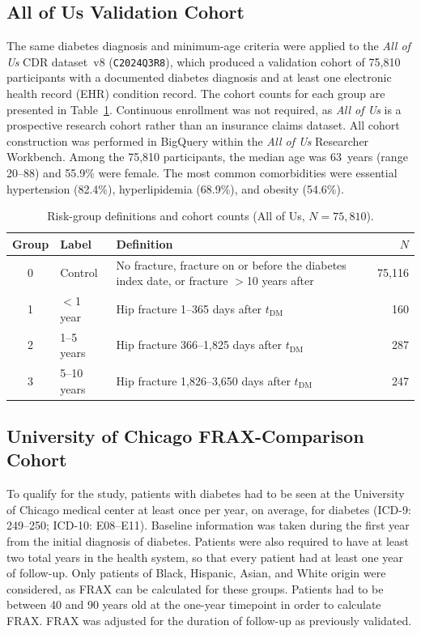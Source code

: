 \documentclass[12pt]{article}
\begin{document}
\subsection{All of Us Validation Cohort}

The same diabetes diagnosis and minimum-age criteria were applied to the \textit{All of Us} CDR dataset~v8 (\texttt{C2024Q3R8}), which produced a validation cohort of 75{,}810 participants with a documented diabetes diagnosis and at least one electronic health record (EHR) condition record. The cohort counts for each group are presented in Table~\ref{tab:groups_aou}. Continuous enrollment was not required, as \textit{All of Us} is a prospective research cohort rather than an insurance claims dataset. All cohort construction was performed in BigQuery within the \textit{All of Us} Researcher Workbench. Among the 75{,}810 participants, the median age was 63~years (range 20--88) and 55.9\% were female. The most common comorbidities were essential hypertension (82.4\%), hyperlipidemia (68.9\%), and obesity (54.6\%). 

  \begin{table}[H]
  \centering
  \caption{Risk-group definitions and cohort counts (All of Us, $N = 75{,}810$).}
  \label{tab:groups_aou}
  \begin{tabular}{clp{6cm}r}
  \toprule
  Group & Label & Definition & $N$ \\
  \midrule
  0 & Control     & No fracture, fracture on or before the diabetes index date, or fracture $>$10 years after & 75{,}116 \\
  1 & $<$1 year   & Hip fracture 1--365 days after $t_{\mathrm{DM}}$ & 160 \\
  2 & 1--5 years  & Hip fracture 366--1{,}825 days after $t_{\mathrm{DM}}$ & 287 \\
  3 & 5--10 years & Hip fracture 1{,}826--3{,}650 days after $t_{\mathrm{DM}}$ & 247 \\
  \bottomrule
  \end{tabular}
  \end{table}

\subsection{University of Chicago FRAX-Comparison Cohort}

To qualify for the study, patients with diabetes had to be seen at the University of Chicago medical center at least once per year, on average, for diabetes (ICD-9: 249--250; ICD-10: E08--E11). Baseline information was taken during the first year from the initial diagnosis of diabetes. Patients were also required to have at least two total years in the health system, so that every patient had at least one year of follow-up. Only patients of Black, Hispanic, Asian, and White origin were considered, as FRAX can be calculated for these groups. Patients had to be between 40 and 90 years old at the one-year timepoint in order to calculate FRAX. FRAX was adjusted for the duration of follow-up as previously validated.
\end{document}
